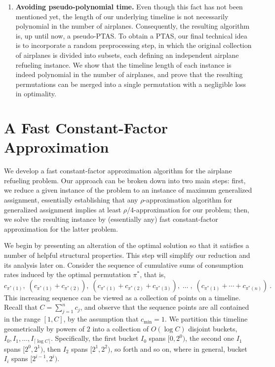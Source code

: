\documentclass[11pt]{article}
\theoremstyle{plain}
\theoremstyle{definition}
\begin{document}
\begin{enumerate}
\item {\bf Avoiding pseudo-polynomial time.} Even though this fact has not been mentioned yet, the length of our underlying timeline is not necessarily polynomial in the number of airplanes. Consequently, the resulting  algorithm is, up until now, a pseudo-PTAS. To obtain a PTAS, our final technical idea is to incorporate a random preprocessing step, in which the original collection of airplanes is divided into subsets, each defining an independent airplane refueling instance. We show that the timeline length of each instance is indeed polynomial in the number of airplanes, and prove that the resulting permutations can be merged into a single permutation with a negligible loss in optimality.
\end{enumerate}



\section{A Fast Constant-Factor Approximation} \label{sec:constant}
We develop a fast constant-factor approximation algorithm for the airplane refueling problem. Our approach can be broken down into two main steps: first, we reduce a given instance of the problem to an instance of maximum generalized assignment, essentially establishing that any $\rho$-approximation algorithm for generalized assignment implies at least $\rho/4$-approximation for our problem; then, we solve the resulting instance by (essentially any) fast constant-factor approximation for the latter problem.

\smallskip {} We begin by presenting an alteration of the optimal solution so that it satisfies a number of helpful structural properties. This step will simplify our reduction and its analysis later on. Consider the sequence of cumulative sums of consumption rates induced by the optimal permutation $\pi^*$, that is,
$$
c_{ \pi^*(1) }, \; (c_{ \pi^*(1) } + c_{ \pi^*(2) }), \; (c_{ \pi^*(1) } + c_{ \pi^*(2) } + c_{ \pi^*(3) }), \; \ldots \;, \; (c_{ \pi^*(1) } + \cdots + c_{ \pi^*(n) }) \ .
$$
This increasing sequence can be viewed as a collection of points on a timeline. Recall that $C = \sum_{j=1}^n c_{j}$, and observe that the sequence points are all contained in the range $[1, C]$, by the assumption that $c_{\min} = 1$. We partition this timeline geometrically by powers of $2$ into a collection of $O(\log C)$ disjoint buckets, $I_0, I_1, \ldots, I_{\lceil \log C \rceil}$. Specifically, the first bucket $I_0$ spans $[0,2^0)$, the second one $I_1$ spans $[2^0,2^1)$, then $I_2$ spans $[2^1,2^2)$, so forth and so on, where in general, bucket $I_i$ spans $[2^{i-1},2^i)$.
\end{document}
